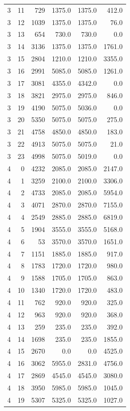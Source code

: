 \begin{longtable}{rrrrrr}
3 & 11 & 729 & 1375.0 & 1375.0 & 412.0\\
3 & 12 & 1039 & 1375.0 & 1375.0 & 76.0\\
3 & 13 & 654 & 730.0 & 730.0 & 0.0\\
3 & 14 & 3136 & 1375.0 & 1375.0 & 1761.0\\
3 & 15 & 2804 & 1210.0 & 1210.0 & 3355.0\\
3 & 16 & 2991 & 5085.0 & 5085.0 & 1261.0\\
3 & 17 & 3081 & 4355.0 & 4342.0 & 0.0\\
3 & 18 & 3821 & 2975.0 & 2975.0 & 846.0\\
3 & 19 & 4190 & 5075.0 & 5036.0 & 0.0\\
3 & 20 & 5350 & 5075.0 & 5075.0 & 275.0\\
3 & 21 & 4758 & 4850.0 & 4850.0 & 183.0\\
3 & 22 & 4913 & 5075.0 & 5075.0 & 21.0\\
3 & 23 & 4998 & 5075.0 & 5019.0 & 0.0\\
4 & 0 & 4232 & 2085.0 & 2085.0 & 2147.0\\
4 & 1 & 3259 & 2100.0 & 2100.0 & 3306.0\\
4 & 2 & 4733 & 2085.0 & 2085.0 & 5954.0\\
4 & 3 & 4071 & 2870.0 & 2870.0 & 7155.0\\
4 & 4 & 2549 & 2885.0 & 2885.0 & 6819.0\\
4 & 5 & 1904 & 3555.0 & 3555.0 & 5168.0\\
4 & 6 & 53 & 3570.0 & 3570.0 & 1651.0\\
4 & 7 & 1151 & 1885.0 & 1885.0 & 917.0\\
4 & 8 & 1783 & 1720.0 & 1720.0 & 980.0\\
4 & 9 & 1588 & 1705.0 & 1705.0 & 863.0\\
4 & 10 & 1340 & 1720.0 & 1720.0 & 483.0\\
4 & 11 & 762 & 920.0 & 920.0 & 325.0\\
4 & 12 & 963 & 920.0 & 920.0 & 368.0\\
4 & 13 & 259 & 235.0 & 235.0 & 392.0\\
4 & 14 & 1698 & 235.0 & 235.0 & 1855.0\\
4 & 15 & 2670 & 0.0 & 0.0 & 4525.0\\
4 & 16 & 3062 & 5955.0 & 2831.0 & 4756.0\\
4 & 17 & 2869 & 4545.0 & 4545.0 & 3080.0\\
4 & 18 & 3950 & 5985.0 & 5985.0 & 1045.0\\
4 & 19 & 5307 & 5325.0 & 5325.0 & 1027.0\\

\end{longtable}
